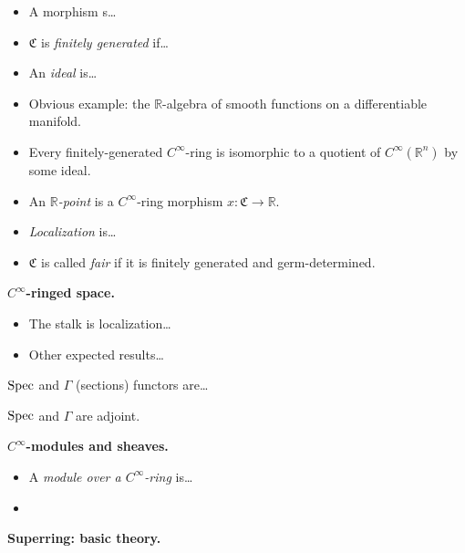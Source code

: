 \begin{definition}
\label{definition-cinf-ring}

\end{definition}

\begin{itemize}
\item A morphism s…
\item $\mathfrak{C}$ is {\it finitely
generated} if…
\item An {\it ideal} is…
\item Obvious example: the
$\mathbb{R}$-algebra of smooth functions on
a differentiable manifold.
\item Every finitely-generated
$C^\infty$-ring is isomorphic to a quotient
of $C^\infty(\mathbb{R}^n)$ by some ideal.
\item An {\it $\mathbb{R}$-point} is a
$C^\infty$-ring morphism $x:\mathfrak{C}\to
\mathbb{R}$.
\item {\it Localization} is…
\item $\mathfrak{C}$ is called {\it fair} if
it is finitely generated and
germ-determined.
\end{itemize}

\medskip\noindent
{\bf $C^\infty$-ringed space.}

\begin{definition}
\label{definition-cinf-ringed-space}

\end{definition}

\begin{itemize}
\item The stalk is localization…
\item Other expected results…
\end{itemize}

\noindent $\mathop{\mathrm{Spec}}$ and $\Gamma$ (sections)
functors are…

\begin{theorem}[Joyce]
\label{theorem-joyce-adjoint-functors}
$\mathop{\mathrm{Spec}}$ and $\Gamma$ are adjoint.
\end{theorem}

\medskip\noindent
{\bf $C^\infty$-modules and sheaves.}

\begin{itemize}
\item A {\it module over a $C^\infty$-ring} 
is…
\item 
\end{itemize}

\medskip\noindent
{\bf Superring: basic theory.}

